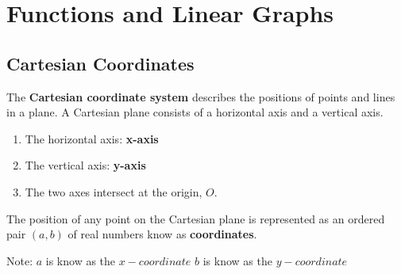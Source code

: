 \documentclass[../main]{subfiles}
\begin{document}
\section{Functions and Linear Graphs}

\subsection{Cartesian Coordinates}

The \textbf{Cartesian coordinate system} describes the positions of points and
lines in a plane. A Cartesian plane consists of a horizontal axis and a vertical
axis.
\begin{enumerate}
\item The horizontal axis: \textbf{x-axis}
\item  The vertical axis: \textbf{y-axis}
\item The two axes intersect at the origin, \(O\).

\end{enumerate}

The position of any point on the Cartesian plane is represented as an ordered
pair \((a,b)\) of real numbers know as \textbf{coordinates}.

Note:
\(a\) is know as the \(x-coordinate\)
\(b\) is know as the \(y-coordinate\)

\end{document}

